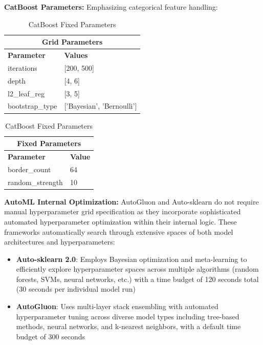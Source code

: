 \documentclass[12pt]{article}
\begin{document}
\vspace{0.5cm}
\textbf{CatBoost Parameters:} Emphasizing categorical feature handling:
\begin{table}[H]
\centering
\footnotesize
\begin{minipage}{0.48\textwidth}
\centering
\begin{tabular}{|l|l|}
\hline
\multicolumn{2}{|c|}{\textbf{Grid Parameters}} \\
\hline
\textbf{Parameter} & \textbf{Values} \\
\hline
iterations & [200, 500] \\
depth & [4, 6] \\
l2\_leaf\_reg & [3, 5] \\
bootstrap\_type & ['Bayesian', 'Bernoulli'] \\
\hline
\end{tabular}
\caption{CatBoost Grid Parameters}
\end{minipage}
\hfill
\begin{minipage}{0.48\textwidth}
\centering
\begin{tabular}{|l|l|}
\hline
\multicolumn{2}{|c|}{\textbf{Fixed Parameters}} \\
\hline
\textbf{Parameter} & \textbf{Value} \\
\hline
border\_count & 64 \\
random\_strength & 10 \\
\hline
\end{tabular}
\caption{CatBoost Fixed Parameters}
\end{minipage}
\end{table}


\textbf{AutoML Internal Optimization:} AutoGluon and Auto-sklearn do not require manual hyperparameter grid specification as they incorporate sophisticated automated hyperparameter optimization within their internal logic. These frameworks automatically search through extensive spaces of both model architectures and hyperparameters:

\begin{itemize}
\item \textbf{Auto-sklearn 2.0}: Employs Bayesian optimization and meta-learning to efficiently explore hyperparameter spaces across multiple algorithms (random forests, SVMs, neural networks, etc.) with a time budget of 120 seconds total (30 seconds per individual model run)
\item \textbf{AutoGluon}: Uses multi-layer stack ensembling with automated hyperparameter tuning across diverse model types including tree-based methods, neural networks, and k-nearest neighbors, with a default time budget of 300 seconds
\end{itemize}
\end{document}
